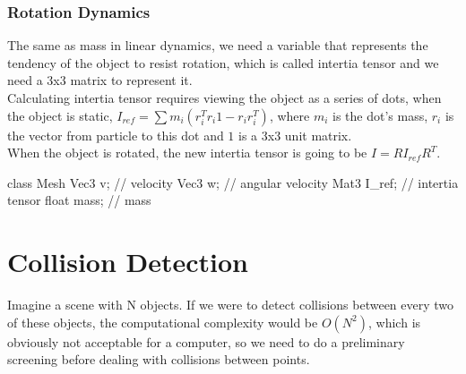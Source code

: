 \documentclass[acmtog]{acmart}
\begin{document}
\subsubsection{Rotation Dynamics}
The same as mass in linear dynamics, we need a variable that represents the tendency of the object to resist rotation, which is called intertia tensor and we need a 3x3 matrix to represent it.\\
Calculating intertia tensor requires viewing the object as a series of dots, when the object is static, $I_{ref}=\sum m_i(r_i^Tr_i1-r_ir_i^T)$, where $m_i$ is the dot's mass, $r_i$ is the vector from particle to this dot and $1$ is a 3x3 unit matrix.\\
When the object is rotated, the new intertia tensor is going to be $I=RI_{ref}R^T$.
\begin{cpp}
class Mesh{
	Vec3 v; // velocity
	Vec3 w; // angular velocity
	Mat3 I_ref; // intertia tensor
	float mass; // mass
}
\end{cpp}
\section{Collision Detection}
Imagine a scene with N objects. If we were to detect collisions between every two of these objects, the computational complexity would be $O(N^2)$, which is obviously not acceptable for a computer, so we need to do a preliminary screening before dealing with collisions between points. 
\end{document}
